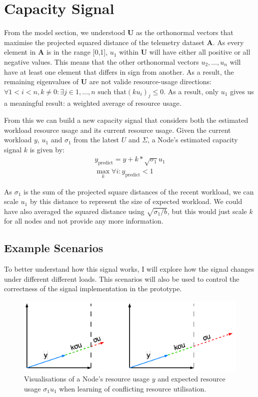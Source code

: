 \section{Capacity Signal}
\label{sec:capacity-signal}
From the model section, we understood $\textbf{U}$ as the orthonormal vectors
that maximise the projected squared distance of the telemetry dataset
$\mathbf{A}$. As every element in $\mathbf{A}$ is in the range [0,1], $u_1$
within $\mathbf{U}$ will have either all positive or all negative values. This
means that the other orthonormal vectors $u_2, \ldots, u_n$ will have at least
one element that differs in sign from another. As a result, the remaining
eigenvalues of $\mathbf{U}$ are not valide resource-usage directions: $\forall 1
< i < n, k \neq 0: \exists j \in {1,\ldots,n} \text{ such that} (ku_i)_j \le 0$.
As a result, only $u_1$ gives us a meaningful result: a weighted average of
resource usage.

From this we can build a new capacity signal that considers both the estimated
workload resource usage and its current resource usage. Given the current
workload $y$, $u_1$ and $\sigma_1$ from the latest $U$ and $\Sigma$, a Node's
estimated capacity signal $k$ is given by:
\begin{align}
    y_{\text{predict}} = y + k * \sqrt{\sigma_1} u_1 \\
    \max_k \forall i: y_{\text{predict}} < 1
\end{align}

As $\sigma_1$ is the sum of the projected square distances of the recent
workload, we can scale $u_1$ by this distance to represent the size of expected
workload. We could have also averaged the squared distance using
$\sqrt{\sigma_1/b}$, but this would just scale $k$ for all nodes and not
provide any more information.

\subsection{Example Scenarios}
\label{sec:signal-example-scenario}
To better understand how this signal works, I will explore how the signal
changes under different different loads. This scenarios will also be used to
control the correctness of the signal implementation in the prototype.

\begin{figure}[H]
    \centering
    \includegraphics[width=\textwidth]{images/conflicting-workload.pdf}
    \caption{Visualisations of a Node's resource usage $y$ and expected resource
    usage $\sigma_1 u_1$ when learning of conflicting resource utilisation.}
    \label{fig:conflicting-workload}
\end{figure}


